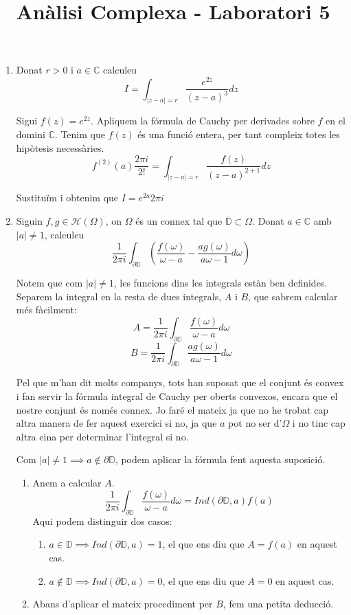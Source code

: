 \documentclass[10pt,a4paper]{article}
\author{ }
\title{Anàlisi Complexa - Laboratori 5}
\begin{document}
\maketitle

\begin{enumerate}
\item Donat $r>0$ i $a\in\mathbb{C}$ calculeu
$$I=\int_{|z-a|=r}\frac{e^{2z}}{(z-a)^{3}}dz$$
\begin{framed}
Sigui $f(z) = e^{2z}$.
Apliquem la fórmula de Cauchy per derivades sobre $f$ en el domini $\mathbb{C}$. Tenim que $f(z)$ és una funció entera, per tant compleix totes les hipòtesis necessàries.
$$f^{(2)}(a) \frac{2\pi i}{2!} = \int_{|z-a|=r}\frac{f(z)}{(z-a)^{2+1}}dz$$

Sustituïm i obtenim que $I=e^{2a}2\pi i$
\end{framed}
\item Siguin $f,g\in\mathcal{H}(\Omega)$, on $\Omega$ és un connex tal que $\overline{\mathbb{D}}\subset \Omega$. Donat $a\in\mathbb{C}$ amb $|a|\neq 1$, calculeu
$$\frac{1}{2\pi i}\int_{\partial\mathbb{D}}\left( \frac{f(\omega)}{\omega - a} - \frac{ag(\omega)}{a\omega - 1} d\omega\right) $$ 
\begin{framed}
Notem que com $|a|\neq 1$, les funcions dins les integrals estàn ben definides.
Separem la integral en la resta de dues integrals, $A$ i $B$, que sabrem calcular més fàcilment:
$$A=\frac{1}{2\pi i}\int_{\partial\mathbb{D}}\frac{f(\omega)}{\omega - a} d\omega$$
$$B=\frac{1}{2\pi i}\int_{\partial\mathbb{D}}\frac{ag(\omega)}{a\omega - 1} d\omega$$

Pel que m'han dit molts companys, tots han suposat que el conjunt és convex i fan servir la fórmula integral de Cauchy per oberts convexos, encara que el nostre conjunt és només connex. Jo faré el mateix ja que no he trobat cap altra manera de fer aquest exercici si no, ja que $a$ pot no ser d'$\Omega$ i no tinc cap altra eina per determinar l'integral si no.

Com $|a|\neq 1 \implies a\notin\partial\mathbb{D}$, podem aplicar la fórmula fent aquesta suposició.

\begin{enumerate}
	\item Anem a calcular $A$.
	$$\frac{1}{2\pi i}\int_{\partial\mathbb{D}}\frac{f(\omega)}{\omega - a} d\omega
	= Ind(\partial\mathbb{D},a)f(a)$$
	Aqui podem distinguir dos casos:
	\begin{enumerate}
		\item $a\in\mathbb{D} \implies Ind(\partial\mathbb{D},a)=1$, el que ens diu que $A=f(a)$ en aquest cas.
		\item $a\notin\mathbb{D} \implies Ind(\partial\mathbb{D},a)=0$, el que ens diu que $A=0$ en aquest cas.
	\end{enumerate}
	\item Abans d'aplicar el mateix procediment per $B$, fem una petita deducció.
	

\end{enumerate}
\end{framed}
\end{enumerate}
\end{document}

